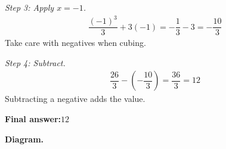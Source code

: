 \documentclass[11pt]{article}
\begin{document}
\textit{Step 3: Apply \( x = -1 \).}
\[\begin{gathered}
\dfrac{(-1)^3}{3} + 3(-1) = -\dfrac{1}{3} - 3 = -\dfrac{10}{3}
\end{gathered}\]
Take care with negatives when cubing.

\textit{Step 4: Subtract.}
\[\begin{gathered}
\dfrac{26}{3} - \left(-\dfrac{10}{3}\right) = \dfrac{36}{3} = 12
\end{gathered}\]
Subtracting a negative adds the value.

\begin{answerbox}
\textbf{Final answer:}\quad \(\displaystyle 12\)
\end{answerbox}
\textbf{Diagram.}

\begin{center}
\end{center}
\end{document}
